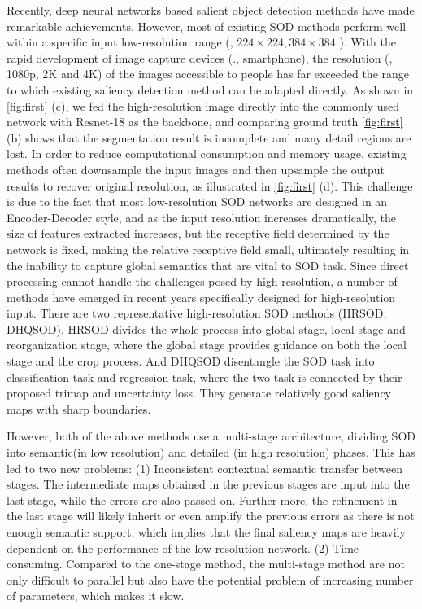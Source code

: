 \documentclass[10pt,twocolumn,letterpaper]{article}
\begin{document}
Recently, deep neural networks based salient object detection methods have made remarkable achievements\cite{chen2018reverse,su2019banet,liu2020dynamic,qin2020u2,ji2021calibrated,fan2020bbs}. However, most of existing SOD methods perform well within a specific input low-resolution range (\eg, $224 \times 224, 384\times 384$ ). With the rapid development of image capture devices (\eg., smartphone), the resolution (\eg, 1080p, 2K and 4K) of the images accessible to people has far exceeded the range to which existing saliency detection method can be adapted directly. As shown in \cref{fig:first} (c), we fed the high-resolution image directly into the commonly used network with Resnet-18 as the backbone, and comparing ground truth \cref{fig:first} (b) shows that the segmentation result is incomplete and many detail regions are lost. In order to reduce computational consumption and memory usage, existing methods often downsample the input images and then upsample the output results to recover original resolution, as illustrated in \cref{fig:first} (d). This challenge is due to the fact that most low-resolution SOD networks are designed in an Encoder-Decoder style, and as the input resolution increases dramatically, the size of features extracted increases, but the receptive field determined by the network is fixed, making the relative receptive field small, ultimately resulting in the inability to capture global semantics that are vital to SOD task. 
Since direct processing cannot handle the challenges posed by high resolution, a number of methods have emerged in recent years specifically designed for high-resolution input.
There are two representative high-resolution SOD methods (HRSOD\cite{zeng2019towards}, DHQSOD\cite{tang2021disentangled}). HRSOD divides the whole process into global stage, local stage and reorganization stage, where the global stage provides guidance on both the local stage and the crop process. And DHQSOD disentangle the SOD task into classification task and regression task, where the two task is connected by their proposed trimap and uncertainty loss. They generate relatively good saliency maps with sharp boundaries. 

However, both of the above methods use a multi-stage architecture, dividing SOD into semantic(in low resolution) and detailed (in high resolution) phases. This has led to two new problems: (1) Inconsistent contextual semantic transfer between stages. The intermediate maps obtained in the previous stages are input into the last stage, while the errors are also passed on. Further more, the refinement in the last stage will likely inherit or even amplify the previous errors as there is not enough semantic support, which implies that the final saliency maps are heavily dependent on the performance of the low-resolution network. (2) Time consuming. Compared to the one-stage method, the multi-stage method are not only difficult to parallel but also have the potential problem of increasing number of parameters, which makes it slow.
\end{document}
